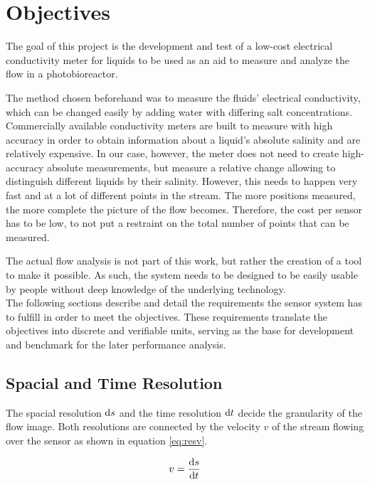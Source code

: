\chapter{Objectives} \label{obj}

The goal of this project is the development and test of a low-cost electrical conductivity meter for liquids to be used as an aid to measure and analyze the flow in a photobioreactor.

The method chosen beforehand was to measure the fluids' electrical conductivity, which can be changed easily by adding water with differing salt concentrations. Commercially available conductivity meters are built to measure with high accuracy in order to obtain information about a liquid's absolute salinity and are relatively expensive. In our case, however, the meter does not need to create high-accuracy absolute measurements, but measure a relative change allowing to distinguish different liquids by their salinity. However, this needs to happen very fast and at a lot of different points in the stream. The more positions measured, the more complete the picture of the flow becomes. Therefore, the cost per sensor has to be low, to not put a restraint on the total number of points that can be measured.

The actual flow analysis is not part of this work, but rather the creation of a tool to make it possible. As such, the system needs to be designed to be easily usable by people without deep knowledge of the underlying technology.\\

The following sections describe and detail the requirements the sensor system has to fulfill in order to meet the objectives. These requirements translate the objectives into discrete and verifiable units, serving as the base for development and benchmark for the later performance analysis. 

\section{Spacial and Time Resolution}

The spacial resolution $ \mathop{}\!\mathrm{d} s $ and the time resolution $ \mathop{}\!\mathrm{d} t $ decide the granularity of the flow image. Both resolutions are connected by the velocity $ v $ of the stream flowing over the sensor as shown in equation \eqref{eq:resv}.

\begin{equation}
	v = \dfrac{\mathop{}\!\mathrm{d} s}{\mathop{}\!\mathrm{d} t}
\label{eq:resv} 
\end{equation}

